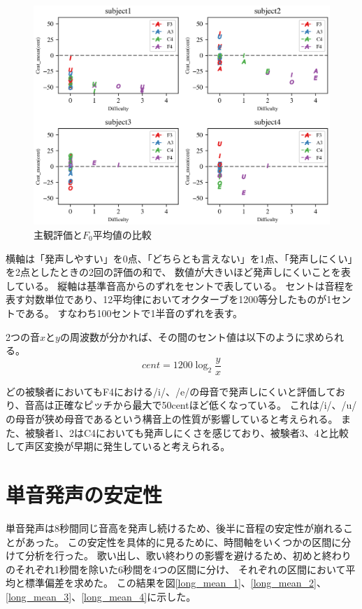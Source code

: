 \documentclass[10.5ptj,a4j,dvipdfmx,uplatex, oneside, openany, report, draft]{jsbook}%
\begin{document}
\begin{figure}[htbp]
    \begin{center}
      \includegraphics[clip,width=12.0cm]{ease.png}
      \caption{主観評価と$F_0$平均値の比較}
      \label{difficulty}
    \end{center}
\end{figure}

横軸は「発声しやすい」を0点、「どちらとも言えない」を1点、「発声しにくい」を2点としたときの2回の評価の和で、
数値が大きいほど発声しにくいことを表している。
縦軸は基準音高からのずれをセントで表している。
セントは音程を表す対数単位であり、12平均律においてオクターブを1200等分したものが1セントである。
すなわち100セントで1半音のずれを表す。

2つの音$x$と$y$の周波数が分かれば、その間のセント値は以下のように求められる。
\begin{equation}
    cent = 1200 \log_2 \frac{y}{x} 
\end{equation}

どの被験者においてもF4における/i/、/e/の母音で発声しにくいと評価しており、音高は正確なピッチから最大で50centほど低くなっている。
これは/i/、/u/の母音が狭め母音であるという構音上の性質が影響していると考えられる。
また、被験者1、2はC4においても発声しにくさを感じており、被験者3、4と比較して声区変換が早期に発生していると考えられる。




\section{単音発声の安定性}
単音発声は8秒間同じ音高を発声し続けるため、後半に音程の安定性が崩れることがあった。
この安定性を具体的に見るために、時間軸をいくつかの区間に分けて分析を行った。
歌い出し、歌い終わりの影響を避けるため、初めと終わりのそれぞれ1秒間を除いた6秒間を4つの区間に分け、
それぞれの区間において平均と標準偏差を求めた。
この結果を図\ref{long_mean_1}、\ref{long_mean_2}、\ref{long_mean_3}、\ref{long_mean_4}に示した。
\end{document}
